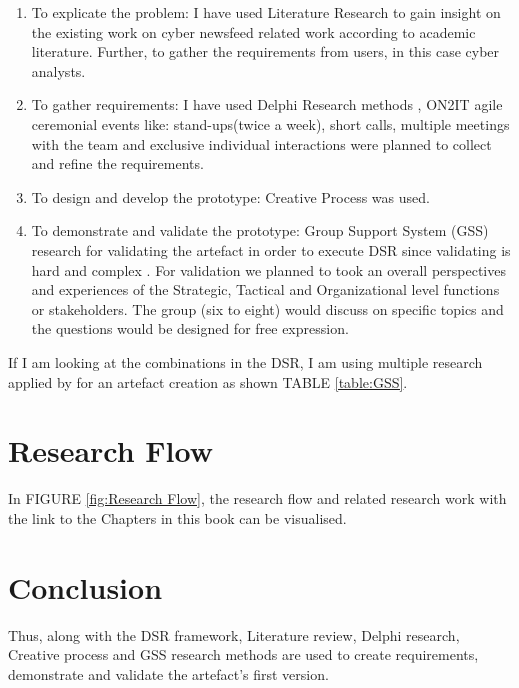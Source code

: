 \begin{enumerate}
    \item To explicate the problem: 
    I have used Literature Research to gain insight on the existing work on cyber newsfeed related work according to academic literature. Further, to gather the requirements from users, in this case cyber analysts.
    
    \item To gather requirements: 
    I have used Delphi Research methods
    \citep{linstone1975delphi}, ON2IT agile ceremonial events like: stand-ups(twice a week), short calls, multiple meetings with the team and exclusive individual interactions were planned to collect and refine the requirements.
    
    \item To design and develop the prototype: 
    Creative Process
    \citep{mednick1962associative} 
    was used.
    
    \item To demonstrate and validate the prototype: 
    Group Support System (GSS) research for validating the artefact 
    in order to execute DSR since validating is hard and complex 
    \citep{arnott2010relevant}. 
    For validation we planned to took an overall perspectives and experiences of the Strategic, Tactical and Organizational level
    \citep{Bobbert-Y-2019} functions or stakeholders. 
    The group (six to eight) would discuss on specific topics and the questions would be designed for free expression.
   
\end{enumerate}
 If I am looking at the combinations in the DSR, I am using multiple research applied by \cite{bobbert2017exploring} for an artefact creation as shown TABLE \ref{table:GSS}.

 \FloatBarrier



\section{Research Flow}
In FIGURE \ref{fig:Research Flow}, the research flow and related research work with the link to the Chapters in this book can be visualised.

 

\section{Conclusion}

Thus, along with the DSR framework, Literature review, Delphi research, Creative process and 
GSS research methods  are used to create requirements,
demonstrate and validate the  artefact's first version.
 

